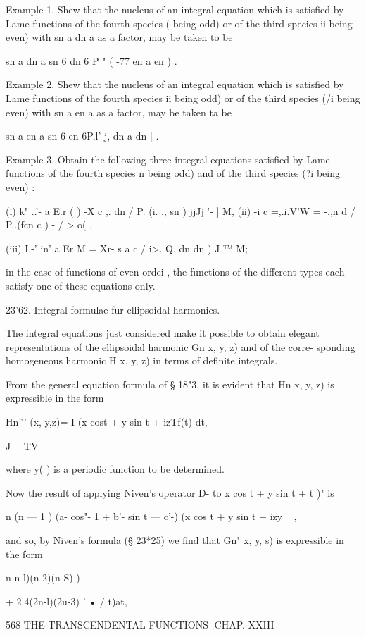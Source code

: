 {{{{{{{{Example 1. Shew that the nucleus of an integral equation which is
satisfied by Lame functions of the fourth species ( being odd) or of
the third species ii being even) with sn a dn a as a factor, may be
taken to be

sn a dn a sn 6 dn 6 P " ( -77 en a en ) .

Example 2. Shew that the nucleus of an integral equation which is
satisfied by Lame functions of the fourth species ii being odd) or of
the third species (/i being even) with sn a en a as a factor, may be
taken ta be

sn a en a sn 6 en 6P,l' j, dn a dn | .

Example 3. Obtain the following three integral equations satisfied by
Lame functions of the fourth species n being odd) and of the third
species (?i being even) :

(i) k" ..'- a E.r ( ) -X c ,. dn / P. (i. ., sn ) jjJj '- ] M, (ii) -i
c =,.i.V'W = -.,n d / P,.(fcn c ) - / > o( ,

(iii) I.-' in' a Er M = Xr- s a c / i>. Q. dn dn ) J ™ M;

in the case of functions of even ordei-, the functions of the
different types each satisfy one of these equations only.

23'62. Integral formulae fur ellipsoidal harmonics.

The integral equations just considered make it possible to obtain
elegant representations of the ellipsoidal harmonic Gn x, y, z) and of
the corre- sponding homogeneous harmonic H x, y, z) in terms of
definite integrals.

From the general equation formula of § 18"3, it is evident that Hn x,
y, z) is expressible in the form

Hn''' (x, y,z)= I (x cost + y sin t + izTf(t) dt,

J —TV

where y( ) is a periodic function to be determined.

Now the result of applying Niven's operator D- to x cos t + y sin t +
t )" is

n (n — 1 ) (a- cos"- 1 + b'- sin t — c'-) (x cos t + y sin t + izy ~ ,

and so, by Niven's formula (§ 23*25) we find that Gn" x, y, s) is
expressible in the form

n n-l)(n-2)(n-S) )

+ 2.4(2n-l)(2u-3) ' • / t)at,

568 THE TRANSCENDENTAL FUNCTIONS [CHAP. XXIII

}}}}}}}}
